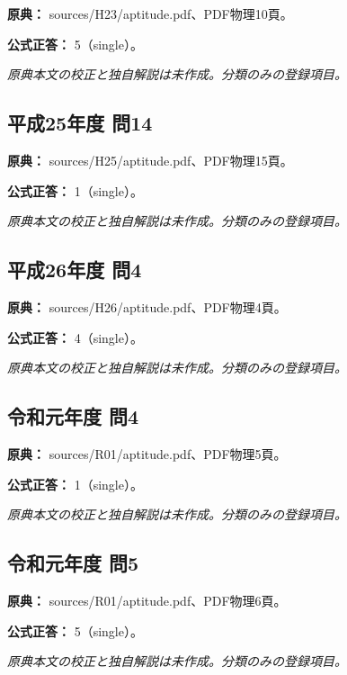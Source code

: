 \noindent\textbf{原典：} sources/H23/aptitude.pdf、PDF物理10頁。

\textbf{公式正答：} 5（single）。

\par\textit{原典本文の校正と独自解説は未作成。分類のみの登録項目。}

\subsection{平成25年度 問14}
\label{q:h25-reg-apt-14}

\noindent\textbf{原典：} sources/H25/aptitude.pdf、PDF物理15頁。

\textbf{公式正答：} 1（single）。

\par\textit{原典本文の校正と独自解説は未作成。分類のみの登録項目。}

\subsection{平成26年度 問4}
\label{q:h26-reg-apt-04}

\noindent\textbf{原典：} sources/H26/aptitude.pdf、PDF物理4頁。

\textbf{公式正答：} 4（single）。

\par\textit{原典本文の校正と独自解説は未作成。分類のみの登録項目。}

\subsection{令和元年度 問4}
\label{q:r01-reg-apt-04}

\noindent\textbf{原典：} sources/R01/aptitude.pdf、PDF物理5頁。

\textbf{公式正答：} 1（single）。

\par\textit{原典本文の校正と独自解説は未作成。分類のみの登録項目。}

\subsection{令和元年度 問5}
\label{q:r01-reg-apt-05}

\noindent\textbf{原典：} sources/R01/aptitude.pdf、PDF物理6頁。

\textbf{公式正答：} 5（single）。

\par\textit{原典本文の校正と独自解説は未作成。分類のみの登録項目。}

